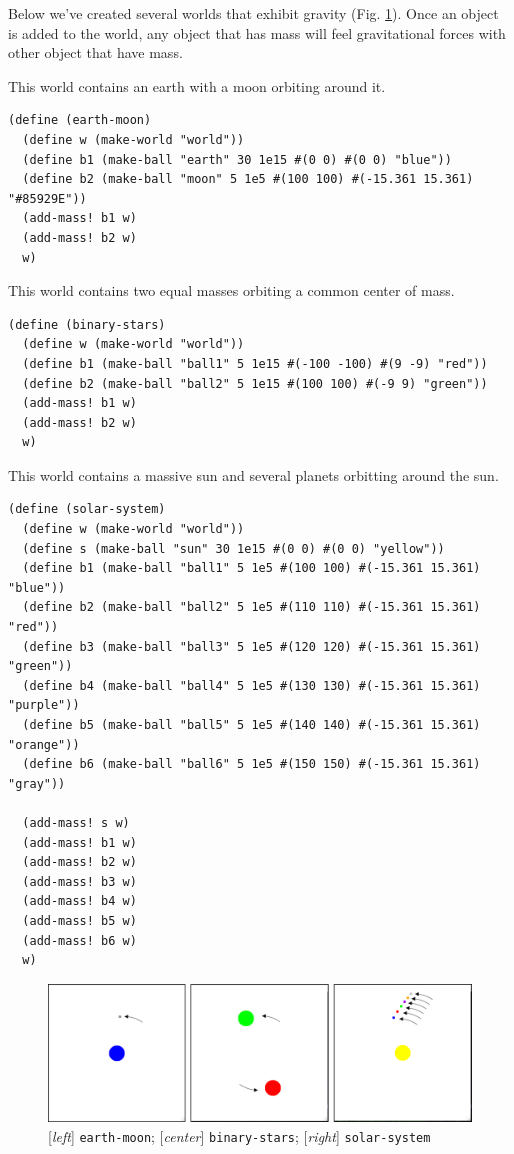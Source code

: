 \documentclass{article}
\begin{document}
Below we've created several worlds that exhibit gravity (Fig. \ref{figure:gravity}). Once an object is added to the world, any object that has mass will feel gravitational forces with other object that have mass.

This world contains an earth with a moon orbiting around it.
{\small\begin{verbatim}
(define (earth-moon)
  (define w (make-world "world"))
  (define b1 (make-ball "earth" 30 1e15 #(0 0) #(0 0) "blue"))
  (define b2 (make-ball "moon" 5 1e5 #(100 100) #(-15.361 15.361) "#85929E"))
  (add-mass! b1 w)
  (add-mass! b2 w)
  w)
\end{verbatim}}

This world contains two equal masses orbiting a common center of mass.
{\small\begin{verbatim}
(define (binary-stars)
  (define w (make-world "world"))
  (define b1 (make-ball "ball1" 5 1e15 #(-100 -100) #(9 -9) "red"))
  (define b2 (make-ball "ball2" 5 1e15 #(100 100) #(-9 9) "green"))
  (add-mass! b1 w)
  (add-mass! b2 w)
  w)
\end{verbatim}}

This world contains a massive sun and several planets orbitting around the sun.
{\small\begin{verbatim}
(define (solar-system)
  (define w (make-world "world"))
  (define s (make-ball "sun" 30 1e15 #(0 0) #(0 0) "yellow"))
  (define b1 (make-ball "ball1" 5 1e5 #(100 100) #(-15.361 15.361) "blue"))
  (define b2 (make-ball "ball2" 5 1e5 #(110 110) #(-15.361 15.361) "red"))
  (define b3 (make-ball "ball3" 5 1e5 #(120 120) #(-15.361 15.361) "green"))
  (define b4 (make-ball "ball4" 5 1e5 #(130 130) #(-15.361 15.361) "purple"))
  (define b5 (make-ball "ball5" 5 1e5 #(140 140) #(-15.361 15.361) "orange"))
  (define b6 (make-ball "ball6" 5 1e5 #(150 150) #(-15.361 15.361) "gray"))

  (add-mass! s w)
  (add-mass! b1 w)
  (add-mass! b2 w)
  (add-mass! b3 w)
  (add-mass! b4 w)
  (add-mass! b5 w)
  (add-mass! b6 w)
  w)
\end{verbatim}}

\begin{figure}[h!]
  \centering
 \includegraphics[width=\textwidth,height=\textheight,keepaspectratio]{figs/gravity.png}
  \caption{[\textit{left}] \texttt{earth-moon}; [\textit{center}] \texttt{binary-stars}; [\textit{right}] \texttt{solar-system}}
  \label{figure:gravity}
\end{figure}
\end{document}
